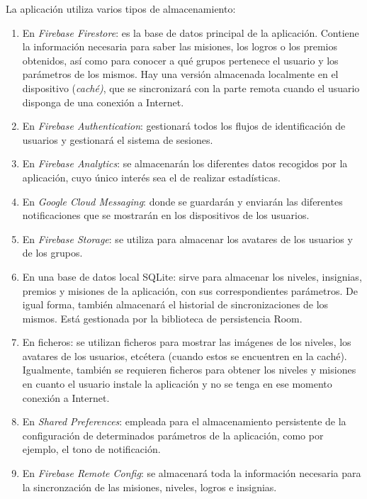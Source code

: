 \documentclass[twoside]{report}
\begin{document}
La aplicación utiliza varios tipos de almacenamiento:
\begin{enumerate}
\item En \textit{Firebase Firestore}: es la base de datos principal de la aplicación. Contiene la información necesaria para saber las misiones, los logros o los premios obtenidos, así como para conocer a qué grupos pertenece el usuario y los parámetros de los mismos. Hay una versión almacenada localmente en el dispositivo (\textit{caché)}, que se sincronizará con la parte remota cuando el usuario disponga de una conexión a Internet.

\item En \textit{Firebase Authentication}: gestionará todos los flujos de identificación de usuarios y gestionará el sistema de sesiones.

\item En \textit{Firebase Analytics}: se almacenarán los diferentes datos recogidos por la aplicación, cuyo único interés sea el de realizar estadísticas.

\item En \textit{Google Cloud Messaging}: donde se guardarán y enviarán las diferentes notificaciones que se mostrarán en los dispositivos de los usuarios.

\item En \textit{Firebase Storage}: se utiliza para almacenar los avatares de los usuarios y de los grupos.
\item En una base de datos local SQLite: sirve para almacenar los niveles, insignias, premios y misiones de la aplicación, con sus correspondientes parámetros. De igual forma, también almacenará el historial de sincronizaciones de los mismos. Está gestionada por \cite{roompersistence} la biblioteca de persistencia Room.

\item En ficheros: se utilizan ficheros para mostrar las imágenes de los niveles, los avatares de los usuarios, etcétera (cuando estos se encuentren en la caché). Igualmente, también se requieren ficheros para obtener los niveles y misiones en cuanto el usuario instale la aplicación y no se tenga en ese momento conexión a Internet.

\item En \textit{Shared Preferences}: empleada para el almacenamiento persistente de la configuración de determinados parámetros de la aplicación, como por ejemplo, el tono de notificación.

\item En \textit{Firebase Remote Config}: se almacenará toda la información necesaria para la sincronzación de las misiones, niveles, logros e insignias. 
\end{enumerate}
\end{document}
